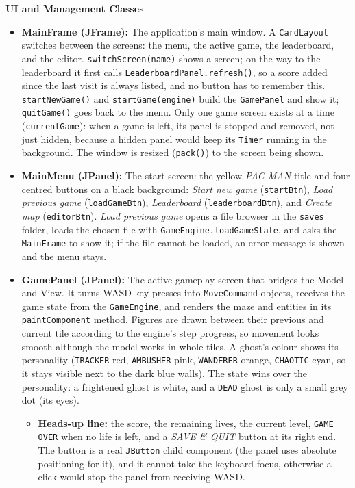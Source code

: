 \documentclass[11pt, a4paper]{article}
\begin{document}
\vspace{0.3cm}
\textbf{UI and Management Classes}
\begin{itemize}
    \item \textbf{MainFrame (JFrame):} The application's main window. A \texttt{CardLayout} switches between the screens: the menu, the active game, the leaderboard, and the editor. \texttt{switchScreen(name)} shows a screen; on the way to the leaderboard it first calls \texttt{LeaderboardPanel.refresh()}, so a score added since the last visit is always listed, and no button has to remember this. \texttt{startNewGame()} and \texttt{startGame(engine)} build the \texttt{GamePanel} and show it; \texttt{quitGame()} goes back to the menu. Only one game screen exists at a time (\texttt{currentGame}): when a game is left, its panel is stopped and removed, not just hidden, because a hidden panel would keep its \texttt{Timer} running in the background. The window is resized (\texttt{pack()}) to the screen being shown.
    \item \textbf{MainMenu (JPanel):} The start screen: the yellow \textit{PAC-MAN} title and four centred buttons on a black background: \textit{Start new game} (\texttt{startBtn}), \textit{Load previous game} (\texttt{loadGameBtn}), \textit{Leaderboard} (\texttt{leaderboardBtn}), and \textit{Create map} (\texttt{editorBtn}). \textit{Load previous game} opens a file browser in the \texttt{saves} folder, loads the chosen file with \texttt{GameEngine.loadGameState}, and asks the \texttt{MainFrame} to show it; if the file cannot be loaded, an error message is shown and the menu stays.
    \item \textbf{GamePanel (JPanel):} The active gameplay screen that bridges the Model and View. It turns WASD key presses into \texttt{MoveCommand} objects, receives the game state from the \texttt{GameEngine}, and renders the maze and entities in its \texttt{paintComponent} method. Figures are drawn between their previous and current tile according to the engine's step progress, so movement looks smooth although the model works in whole tiles. A ghost's colour shows its personality (\texttt{TRACKER} red, \texttt{AMBUSHER} pink, \texttt{WANDERER} orange, \texttt{CHAOTIC} cyan, so it stays visible next to the dark blue walls). The state wins over the personality: a frightened ghost is white, and a \texttt{DEAD} ghost is only a small grey dot (its eyes).
    \begin{itemize}
        \item \textbf{Heads-up line:} the score, the remaining lives, the current level, \texttt{GAME OVER} when no life is left, and a \textit{SAVE \& QUIT} button at its right end. The button is a real \texttt{JButton} child component (the panel uses absolute positioning for it), and it cannot take the keyboard focus, otherwise a click would stop the panel from receiving WASD.

\end{itemize}
\end{itemize}
\end{document}
